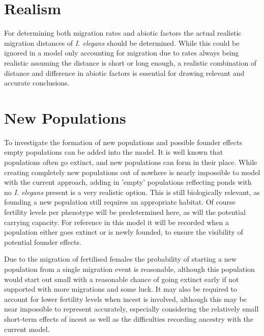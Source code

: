 \documentclass{article}
\begin{document}
\section{Realism}
For determining both migration rates and abiotic factors the actual realistic migration distances of \textit{I. elegans} should be determined. While this could be ignored in a model only accounting for migration due to rates always being realistic assuming the distance is short or long enough, a realistic combination of distance and difference in abiotic factors is essential for drawing relevant and accurate conclusions.

\section{New Populations}
To investigate the formation of new populations and possible founder effects empty populations can be added into the model. It is well known that populations often go extinct, and new populations can form in their place. While creating completely new populations out of nowhere is nearly impossible to model with the current approach, adding in 'empty' populations reflecting ponds with no \textit{I. elegans} present is a very realistic option. This is still biologically relevant, as founding a new population still requires an appropriate habitat. Of course fertility levels per phenotype will be predetermined here, as will the potential carrying capacity. For reference in this model it will be recorded when a population either goes extinct or is newly founded, to ensure the visibility of potential founder effects.

Due to the migration of fertilised females the probability of starting a new population from a single migration event is reasonable, although this population would start out small with a reasonable chance of going extinct early if not supported with more migrations and some luck. It may also be required to account for lower fertility levels when incest is involved, although this may be near impossible to represent accurately, especially considering the relatively small short-term effects of incest as well as the difficulties recording ancestry with the current model.

\printbibliography
\end{document}
